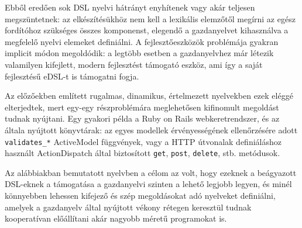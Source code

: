 Ebből eredően sok \gls{DSL} nyelvi hátrányt enyhítenek vagy akár teljesen megszüntetnek: az elkészítésükhöz nem kell a lexikális elemzőtől megírni az egész fordítóhoz szükséges összes komponenst, elegendő a gazdanyelvet kihasználva a megfelelő nyelvi elemeket definiálni.
A fejlesztőeszközök problémája gyakran implicit módon megoldódik: a legtöbb esetben a gazdanyelvhez már létezik valamilyen kifejlett, modern fejlesztést támogató eszköz, ami így a saját fejlesztésű \gls{eDSL}-t is támogatni fogja.

Az előzőekben említett rugalmas, dinamikus, értelmezett nyelvekben ezek eléggé elterjedtek, mert egy-egy részproblémára meglehetősen kifinomult megoldást tudnak nyújtani.
Egy gyakori példa a Ruby on Rails webkeretrendszer, és az általa nyújtott könyvtárak: az egyes modellek érvényességének ellenőrzésére adott {\tt validates\_*} ActiveModel függvények, vagy a HTTP útvonalak definiáláshoz használt ActionDispatch által biztosított {\tt get}, {\tt post}, {\tt delete}, stb. metódusok.

Az alábbiakban bemutatott nyelvben a célom az volt, hogy ezeknek a beágyazott \gls{DSL}-eknek a támogatása a gazdanyelvi szinten a lehető legjobb legyen, és minél könnyebben lehessen kifejező és szép megoldásokat adó nyelveket definiálni, amelyek a gazdanyelv által nyújtott vékony rétegen keresztül tudnak kooperatívan előállítani akár nagyobb méretű programokat is.







